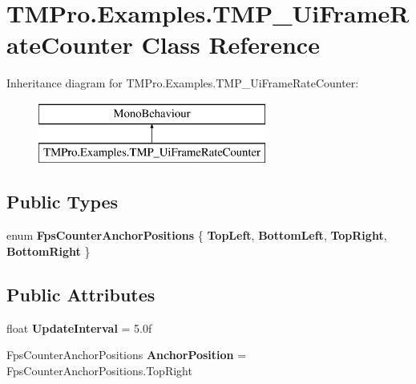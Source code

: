 \hypertarget{class_t_m_pro_1_1_examples_1_1_t_m_p___ui_frame_rate_counter}{}\section{T\+M\+Pro.\+Examples.\+T\+M\+P\+\_\+\+Ui\+Frame\+Rate\+Counter Class Reference}
\label{class_t_m_pro_1_1_examples_1_1_t_m_p___ui_frame_rate_counter}
Inheritance diagram for T\+M\+Pro.\+Examples.\+T\+M\+P\+\_\+\+Ui\+Frame\+Rate\+Counter\+:\begin{figure}[H]
\begin{center}
\leavevmode
\includegraphics[height=2.000000cm]{class_t_m_pro_1_1_examples_1_1_t_m_p___ui_frame_rate_counter}
\end{center}
\end{figure}
\subsection*{Public Types}
\begin{DoxyCompactItemize}
\item 
\mbox{\label{class_t_m_pro_1_1_examples_1_1_t_m_p___ui_frame_rate_counter_acd8edef652a3eca75ad3e389002d2ece}} 
enum {\bfseries Fps\+Counter\+Anchor\+Positions} \{ {\bfseries Top\+Left}, 
{\bfseries Bottom\+Left}, 
{\bfseries Top\+Right}, 
{\bfseries Bottom\+Right}
 \}
\end{DoxyCompactItemize}
\subsection*{Public Attributes}
\begin{DoxyCompactItemize}
\item 
\mbox{\label{class_t_m_pro_1_1_examples_1_1_t_m_p___ui_frame_rate_counter_a826c5dd240c35cc3cec70d82d0e6d76e}} 
float {\bfseries Update\+Interval} = 5.\+0f
\item 
\mbox{\label{class_t_m_pro_1_1_examples_1_1_t_m_p___ui_frame_rate_counter_a1088605129e1b56d212d3dd4aa9d1e80}} 
Fps\+Counter\+Anchor\+Positions {\bfseries Anchor\+Position} = Fps\+Counter\+Anchor\+Positions.\+Top\+Right
\end{DoxyCompactItemize}
